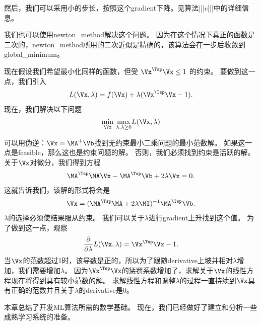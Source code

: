 然后，我们可以采用小的步长，按照这个\gls{gradient}下降。见算法|||c|||中的详细信息。

我们也可以使用\gls{newton_method}解决这个问题。
因为在这个情况下真正的函数是二次的，\gls{newton_method}所用的二次近似是精确的，该算法会在一步后收敛到\gls{global_minimum}。

现在假设我们希望最小化同样的函数，但受 $\Vx^\Tsp \Vx \leq 1$ 的约束。 
要做到这一点，我们引入
\begin{align}
 L(\Vx, \lambda) = f(\Vx) + \lambda (\Vx^\Tsp \Vx - 1).
\end{align}
现在，我们解决以下问题
\begin{align}
  \underset{\Vx}{\min}~
 \underset{\lambda, \lambda \geq 0}{\max} L(\Vx, \lambda) 
\end{align}


可以用伪逆：$\Vx = \MA^+ \Vb$找到无约束最小二乘问题的最小范数解。
如果这一点是\gls{feasible}，那么这也是约束问题的解。
否则，我们必须找到约束是活跃的解。
关于$\Vx$对微分，我们得到方程
\begin{align}
 \MA^\Tsp \MA \Vx - \MA^\Tsp \Vb + 2 \lambda \Vx = 0.
\end{align}
这就告诉我们，该解的形式将会是
\begin{align}
\Vx =  (\MA^\Tsp \MA + 2 \lambda \MI )^{-1} \MA^\Tsp \Vb.
\end{align}
$\lambda$的选择必须使结果服从约束。
我们可以关于$\lambda$进行\gls{gradient}上升找到这个值。
为了做到这一点，观察
\begin{align}
 \frac{\partial}{\partial \lambda} L(\Vx, \lambda)  = \Vx^\Tsp \Vx - 1.
\end{align}
当$\Vx$的范数超过1时，该导数是正的，所以为了跟随\gls{derivative}上坡并相对$\lambda$增加，我们需要增加$\lambda$。
因为$\Vx^\Tsp \Vx$的惩罚系数增加了，求解关于$\Vx$的线性方程现在将得到具有较小范数的解。
求解线性方程和调整$\lambda$的过程一直持续到$\Vx$具有正确的范数并且关于$\lambda$的\gls{derivative}是$0$。

本章总结了开发\gls{ML}算法所需的数学基础。
现在，我们已经做好了建立和分析一些成熟学习系统的准备。


